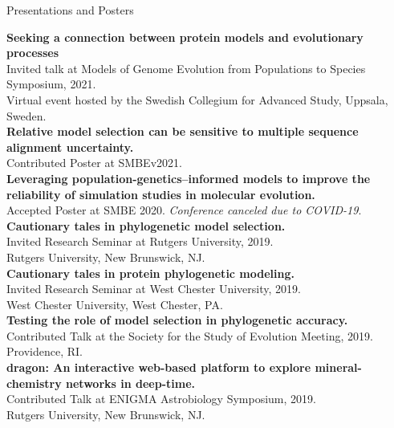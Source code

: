 \documentclass{resume} %
\begin{document}
\vspace*{0.5cm}
\begin{rSection}{Presentations and Posters}
\vspace*{0.25cm}


\textbf{Seeking a connection between protein models and evolutionary processes}
\\ Invited talk at Models of Genome Evolution from Populations to Species Symposium, 2021.
\\ Virtual event hosted by the Swedish Collegium for Advanced Study, Uppsala, Sweden. \\ 


\textbf{Relative model selection can be sensitive to multiple sequence alignment uncertainty.}
\\ Contributed Poster at SMBEv2021. \\


\textbf{Leveraging population-genetics--informed models to improve the reliability of simulation studies in molecular evolution.}
\\ Accepted Poster at SMBE 2020. \emph{Conference canceled due to COVID-19}. \\


\textbf{Cautionary tales in phylogenetic model selection.}
\\ Invited Research Seminar at Rutgers University, 2019.
\\ Rutgers University, New Brunswick, NJ.\\


\textbf{Cautionary tales in protein phylogenetic modeling.}
\\ Invited Research Seminar at West Chester University, 2019.
\\ West Chester University, West Chester, PA.\\


\textbf{Testing the role of model selection in phylogenetic accuracy.}
\\ Contributed Talk at the Society for the Study of Evolution Meeting, 2019.
\\ Providence, RI.\\

\textbf{dragon: An interactive web-based platform to explore mineral-chemistry networks in deep-time.} 
\\ Contributed Talk at ENIGMA Astrobiology Symposium, 2019.
\\ Rutgers University, New Brunswick, NJ.\\



\end{rSection}
\end{document}

